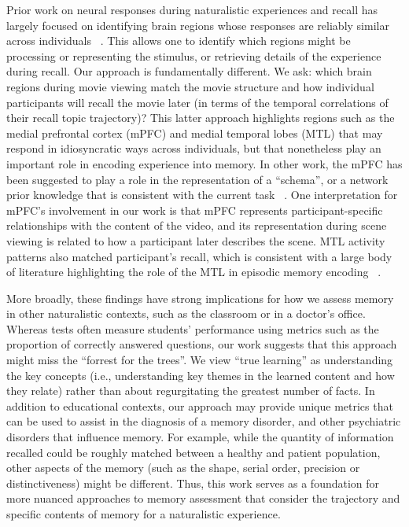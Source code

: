 \documentclass{article}
\begin{document}
Prior work on neural responses during naturalistic experiences and recall has largely focused on identifying brain regions whose responses are reliably similar across individuals ~\citep{LernEtal11, SimoEtal16, ChenEtal17, BaldEtal17, ZadbEtal17}. This allows one to identify which regions might be processing or representing the stimulus, or retrieving details of the experience during recall. Our approach is fundamentally different. We ask: which brain regions during movie viewing match the movie structure and how individual participants will recall the movie later (in terms of the temporal correlations of their recall topic trajectory)? This latter approach highlights regions such as the medial prefrontal cortex (mPFC) and medial temporal lobes (MTL) that may respond in idiosyncratic ways across individuals, but that nonetheless play an important role in encoding experience into memory. In other work, the mPFC has been suggested to play a role in the representation of a ``schema'', or a network prior knowledge that is consistent with the current task ~\citep{KestEtal12, GilbMarl17}. One interpretation for mPFC's involvement in our work is that mPFC represents participant-specific relationships with the content of the video, and its representation during scene viewing is related to how a participant later describes the scene. MTL activity patterns also matched participant's recall, which is consistent with a large body of literature highlighting the role of the MTL in episodic memory encoding ~\citep{PallWagn02, DavaEtAl03, RangEtal04, Dava06}.

More broadly, these findings have strong implications for how we assess memory in other naturalistic contexts, such as the classroom or in a doctor's office.  Whereas tests often measure students' performance using metrics such as the proportion of correctly answered questions, our work suggests that this approach might miss the ``forrest for the trees''. We view ``true learning'' as understanding the key concepts (i.e., understanding key themes in the learned content and how they relate) rather than about regurgitating the greatest number of facts. In addition to educational contexts, our approach may provide unique metrics that can be used to assist in the diagnosis of a memory disorder, and other psychiatric disorders that influence memory. For example, while the quantity of information recalled could be roughly matched between a healthy and patient population, other aspects of the memory (such as the shape, serial order, precision or distinctiveness) might be different. Thus, this work serves as a foundation for more nuanced approaches to memory assessment that consider the trajectory and specific contents of memory for a naturalistic experience.
\end{document}
